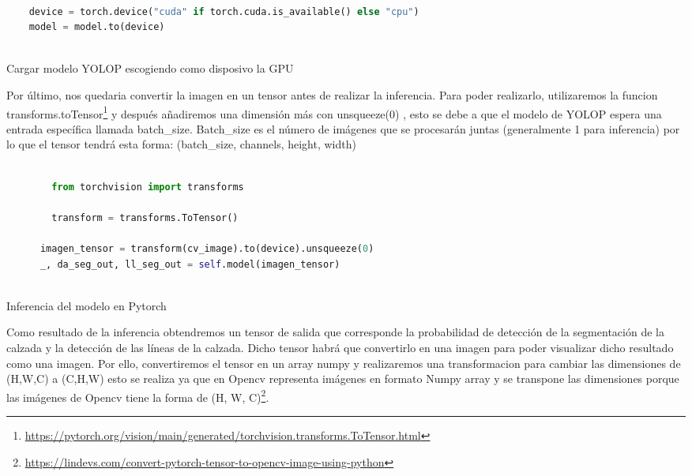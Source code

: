   
  \begin{code}[h]
    \begin{lstlisting}[language=Python]
   
    device = torch.device("cuda" if torch.cuda.is_available() else "cpu")
    model = model.to(device)
  
    \end{lstlisting}
    \caption[Cargar modelo YOLOP escogiendo como disposivo la GPU]{Cargar modelo YOLOP escogiendo como disposivo la GPU}
    \label{cod:codeloadYOLOP}
    \end{code}  

    Por último, nos quedaria convertir la imagen en un tensor antes de realizar la inferencia. Para poder realizarlo, utilizaremos la funcion transforms.toTensor\footnote{\url{https://pytorch.org/vision/main/generated/torchvision.transforms.ToTensor.html}} 
    y después añadiremos una dimensión más con unsqueeze(0) , esto se debe 
    a que el modelo de YOLOP espera una entrada específica llamada batch\_size. Batch\_size es el número de imágenes que se procesarán juntas
    (generalmente 1 para inferencia) por lo que el tensor tendrá esta forma: (batch\_size, channels, height, width)\newline

    \begin{code}[h]
      \begin{lstlisting}[language=Python]
     
        from torchvision import transforms

        transform = transforms.ToTensor() 
                    
      imagen_tensor = transform(cv_image).to(device).unsqueeze(0)
      _, da_seg_out, ll_seg_out = self.model(imagen_tensor)
    
      \end{lstlisting}
      \caption[Inferencia del modelo]{Inferencia del modelo en Pytorch}
      \label{cod:codejemplo}
      \end{code}  

    Como resultado de la inferencia obtendremos un tensor de salida que corresponde la probabilidad de detección de la segmentación
    de la calzada y la detección de las líneas de la calzada. Dicho tensor habrá que convertirlo en una imagen para poder visualizar
    dicho resultado como una imagen. 
    Por ello, convertiremos el tensor en un array numpy y realizaremos una transformacion para cambiar las dimensiones de (H,W,C) 
    a (C,H,W) esto se realiza ya que en Opencv representa imágenes en formato Numpy array y se transpone las dimensiones porque las
    imágenes de Opencv tiene la forma de (H, W, C)\footnote{\url{https://lindevs.com/convert-pytorch-tensor-to-opencv-image-using-python}}. 
    \newline

